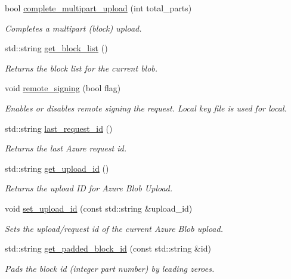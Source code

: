 \begin{DoxyCompactItemize}
bool \hyperlink{class_vessel_1_1_networking_1_1_azure_client_abfcd51780d84a5b4f7735fd18bca08ec}{complete\+\_\+multipart\+\_\+upload} (int total\+\_\+parts)
\begin{DoxyCompactList}\small\item\em Completes a multipart (block) upload. \end{DoxyCompactList}\item 
std\+::string \hyperlink{class_vessel_1_1_networking_1_1_azure_client_a103016ab4521dacb9e6b7c24a2c3496a}{get\+\_\+block\+\_\+list} ()
\begin{DoxyCompactList}\small\item\em Returns the block list for the current blob. \end{DoxyCompactList}\item 
\mbox{\label{class_vessel_1_1_networking_1_1_azure_client_a65eb07517634e97d9a180eb4d429bce2}} 
void \hyperlink{class_vessel_1_1_networking_1_1_azure_client_a65eb07517634e97d9a180eb4d429bce2}{remote\+\_\+signing} (bool flag)
\begin{DoxyCompactList}\small\item\em Enables or disables remote signing the request. Local key file is used for local. \end{DoxyCompactList}\item 
std\+::string \hyperlink{class_vessel_1_1_networking_1_1_azure_client_aabdd68349e22f2124804d725bde09123}{last\+\_\+request\+\_\+id} ()
\begin{DoxyCompactList}\small\item\em Returns the last Azure request id. \end{DoxyCompactList}\item 
std\+::string \hyperlink{class_vessel_1_1_networking_1_1_azure_client_a74e4cfe536c3099aadf1c8df785f53d4}{get\+\_\+upload\+\_\+id} ()
\begin{DoxyCompactList}\small\item\em Returns the upload ID for Azure Blob Upload. \end{DoxyCompactList}\item 
\mbox{\label{class_vessel_1_1_networking_1_1_azure_client_a73021b3608871fe36a0172d0481f0e53}} 
void \hyperlink{class_vessel_1_1_networking_1_1_azure_client_a73021b3608871fe36a0172d0481f0e53}{set\+\_\+upload\+\_\+id} (const std\+::string \&upload\+\_\+id)
\begin{DoxyCompactList}\small\item\em Sets the upload/request id of the current Azure Blob upload. \end{DoxyCompactList}\item 
std\+::string \hyperlink{class_vessel_1_1_networking_1_1_azure_client_ae2c4d287ee5c326380c426a91dae7b23}{get\+\_\+padded\+\_\+block\+\_\+id} (const std\+::string \&id)
\begin{DoxyCompactList}\small\item\em Pads the block id (integer part number) by leading zeroes. \end{DoxyCompactList}\end{DoxyCompactItemize}
